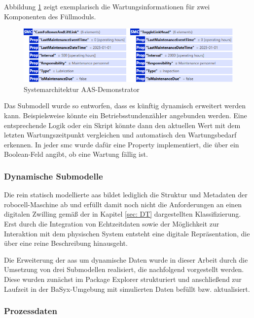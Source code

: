 Abbildung \ref{fig:Wartung} zeigt exemplarisch die Wartungsinformationen für zwei Komponenten des Füllmoduls.

\begin{figure}[htbp]
    \centering
        \includegraphics[width=1\textwidth]{Bilder/Ergebnisse/StatischeDaten/Wartung.png}
    \caption{Systemarchitektur AAS-Demonstrator}
    \label{fig:Wartung}
\end{figure}

Das Submodell wurde so entworfen, dass es künftig dynamisch erweitert werden kann. 
Beispielsweise könnte ein Betriebsstundenzähler angebunden werden. 
Eine entsprechende Logik oder ein Skript könnte dann den aktuellen Wert mit dem letzten Wartungszeitpunkt vergleichen und automatisch den Wartungsbedarf erkennen. 
In jeder \acs{smc} wurde dafür eine Property implementiert, die über ein Boolean-Feld angibt, ob eine Wartung fällig ist.

\newpage
\subsubsection{Dynamische Submodelle}
Die rein statisch modellierte \acs{aas} bildet lediglich die Struktur und Metadaten der robocell-Maschine ab und erfüllt damit noch nicht die Anforderungen an einen digitalen Zwilling gemäß der in Kapitel \ref{sec: DT} dargestellten Klassifizierung. 
Erst durch die Integration von Echtzeitdaten sowie der Möglichkeit zur Interaktion mit dem physischen System entsteht eine digitale Repräsentation, die über eine reine Beschreibung hinausgeht.

Die Erweiterung der \acs{aas} um dynamische Daten wurde in dieser Arbeit durch die Umsetzung von drei Submodellen realisiert, die nachfolgend vorgestellt werden. 
Diese wurden zunächst im Package Explorer strukturiert und anschließend zur Laufzeit in der BaSyx-Umgebung mit simulierten Daten befüllt bzw. aktualisiert.

\subsubsection*{Prozessdaten}
\vspace{-0.5em}

